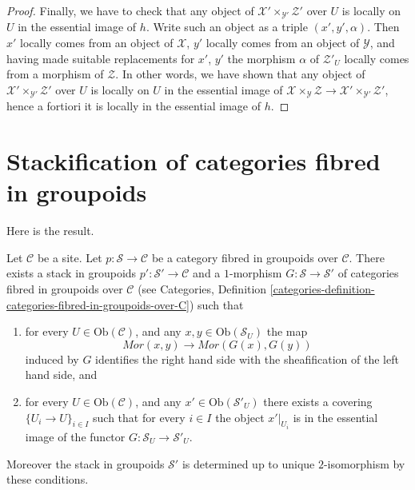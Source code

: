\begin{proof}
\medskip\noindent
Finally, we have to check that any object of
$\mathcal{X}' \times_{\mathcal{Y}'} \mathcal{Z}'$
over $U$ is locally on $U$ in the essential image of $h$.
Write such an object as a triple $(x', y', \alpha)$.
Then $x'$ locally comes from an object of $\mathcal{X}$,
$y'$ locally comes from an object of $\mathcal{Y}$, and
having made suitable replacements for $x'$, $y'$ the morphism
$\alpha$ of $\mathcal{Z}'_U$ locally comes from a morphism of
$\mathcal{Z}$. In other words, we have shown that any object of
$\mathcal{X}' \times_{\mathcal{Y}'} \mathcal{Z}'$
over $U$ is locally on $U$ in the essential image of
$\mathcal{X} \times_{\mathcal{Y}} \mathcal{Z} \to
\mathcal{X}' \times_{\mathcal{Y}'} \mathcal{Z}'$, hence
a fortiori it is locally in the essential image of $h$.
\end{proof}




\section{Stackification of categories fibred in groupoids}
\label{section-stackify-groupoids}

\noindent
Here is the result.

\begin{lemma}
\label{lemma-stackify-groupoids}
Let $\mathcal{C}$ be a site.
Let $p : \mathcal{S} \to \mathcal{C}$ be a category
fibred in groupoids over $\mathcal{C}$.
There exists a stack in groupoids
$p' : \mathcal{S}' \to \mathcal{C}$ and a
$1$-morphism $G : \mathcal{S} \to \mathcal{S}'$
of categories fibred in groupoids over $\mathcal{C}$ (see
Categories, Definition
\ref{categories-definition-categories-fibred-in-groupoids-over-C})
such that
\begin{enumerate}
\item for every $U \in \text{Ob}(\mathcal{C})$, and any
$x, y \in \text{Ob}(\mathcal{S}_U)$ the map
$$
\mathit{Mor}(x, y) \longrightarrow \mathit{Mor}(G(x), G(y))
$$
induced by $G$ identifies the right hand side with the sheafification
of the left hand side, and
\item for every $U \in \text{Ob}(\mathcal{C})$, and any
$x' \in \text{Ob}(\mathcal{S}'_U)$ there exists a covering
$\{U_i \to U\}_{i \in I}$ such that for every $i \in I$ the
object $x'|_{U_i}$ is in the essential image of the
functor $G : \mathcal{S}_U \to \mathcal{S}'_U$.
\end{enumerate}
Moreover the stack in groupoids $\mathcal{S}'$ is determined up to unique
$2$-isomorphism by these conditions.
\end{lemma}

